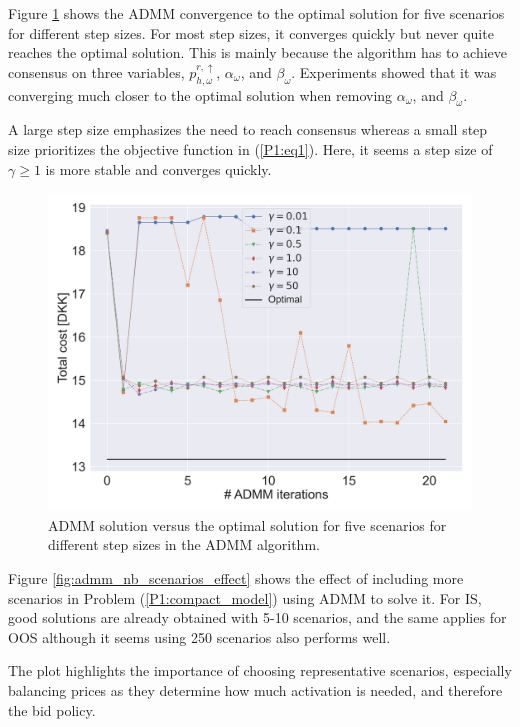 Figure \ref{fig:admm_vs_normal_solution} shows the ADMM convergence to the optimal solution for five scenarios for different step sizes. For most step sizes, it converges quickly but never quite reaches the optimal solution. This is mainly because the algorithm has to achieve consensus on three variables, $p_{h,\omega}^{r,\uparrow}$, $\alpha_{\omega}$, and $\beta_{\omega}$. Experiments showed that it was converging much closer to the optimal solution when removing $\alpha_{\omega}$, and $\beta_{\omega}$.

A large step size emphasizes the need to reach consensus whereas a small step size prioritizes the objective function in (\ref{P1:eq1}). Here, it seems a step size of $\gamma \geq 1$ is more stable and converges quickly.

\begin{figure}[!t]
    \centering
    \includegraphics[width=\columnwidth]{../figures/admm_vs_normal_solution.png}
    \caption{ADMM solution versus the optimal solution for five scenarios for different step sizes in the ADMM algorithm.}
    \label{fig:admm_vs_normal_solution}
\end{figure}

Figure \ref{fig:admm_nb_scenarios_effect} shows the effect of including more scenarios in Problem (\ref{P1:compact_model}) using ADMM to solve it. For IS, good solutions are already obtained with 5-10 scenarios, and the same applies for OOS although it seems using 250 scenarios also performs well.

The plot highlights the importance of choosing representative scenarios, especially balancing prices as they determine how much activation is needed, and therefore the bid policy.

